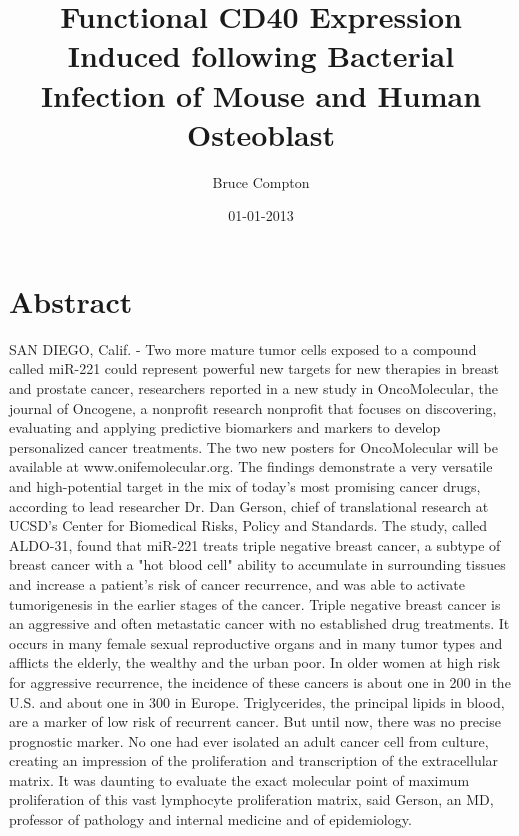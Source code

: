 \documentclass{article}%
\title{Functional CD40 Expression Induced following Bacterial Infection of Mouse and Human Osteoblast}%
\author{Bruce Compton}%
\affil{Department of Biochemistry, Institute of Medical Sciences, Banaras Hindu University, Varanasi, India}%
\date{01{-}01{-}2013}%
\begin{document}
%
\normalsize%
\maketitle%
\section{Abstract}%
\label{sec:Abstract}%
SAN DIEGO, Calif. {-} Two more mature tumor cells exposed to a compound called miR{-}221 could represent powerful new targets for new therapies in breast and prostate cancer, researchers reported in a new study in OncoMolecular, the journal of Oncogene, a nonprofit research nonprofit that focuses on discovering, evaluating and applying predictive biomarkers and markers to develop personalized cancer treatments.\newline%
The two new posters for OncoMolecular will be available at www.onifemolecular.org.\newline%
The findings demonstrate a very versatile and high{-}potential target in the mix of today's most promising cancer drugs, according to lead researcher Dr. Dan Gerson, chief of translational research at UCSD's Center for Biomedical Risks, Policy and Standards.\newline%
The study, called ALDO{-}31, found that miR{-}221 treats triple negative breast cancer, a subtype of breast cancer with a "hot blood cell" ability to accumulate in surrounding tissues and increase a patient's risk of cancer recurrence, and was able to activate tumorigenesis in the earlier stages of the cancer.\newline%
Triple negative breast cancer is an aggressive and often metastatic cancer with no established drug treatments. It occurs in many female sexual reproductive organs and in many tumor types and afflicts the elderly, the wealthy and the urban poor.\newline%
In older women at high risk for aggressive recurrence, the incidence of these cancers is about one in 200 in the U.S. and about one in 300 in Europe. Triglycerides, the principal lipids in blood, are a marker of low risk of recurrent cancer.\newline%
But until now, there was no precise prognostic marker. No one had ever isolated an adult cancer cell from culture, creating an impression of the proliferation and transcription of the extracellular matrix.\newline%
It was daunting to evaluate the exact molecular point of maximum proliferation of this vast lymphocyte proliferation matrix, said Gerson, an MD, professor of pathology and internal medicine and of epidemiology.\newline%
\end{document}
